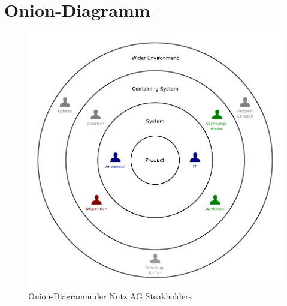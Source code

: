 \documentclass[12pt,a4paper,german]{article}
\author{Denis Augsburger, Pierro Steinger, Thomas Wilde, Nicolas Mauchle, }
\begin{document}

\newpage
\tableofcontents


\newpage
\section{Onion-Diagramm}
\begin{center}
  \begin{figure}[ht]
    \includegraphics{graphics/onion.pdf}
    \caption{Onion-Diagramm der Nutz AG Steakholders}
    \label{fig:awesome_image}
  \end{figure}
\end{center}


\newpage

\newpage

\end{document}

